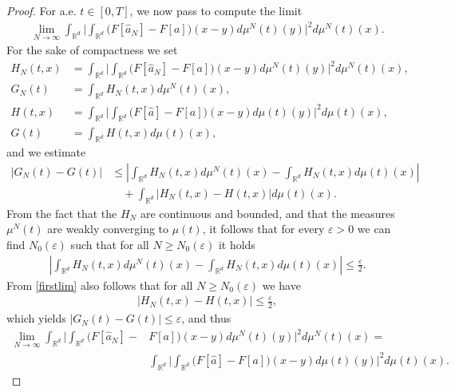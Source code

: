 \documentclass[A4paper,11pt]{article}
\theoremstyle{definition}
\newcommand{\R}{\mathbb{R}}
\begin{document}
\begin{proof}
	For a.e. $t \in [0,T]$, we now pass to compute the limit
	\begin{align*}
		\lim_{N\rightarrow\infty}
			\int_{\R^d}\Biggl|\int_{\R^d}\bigl(F[\widehat a_{N}]-F[a]\bigr)(x-y)d\mu^{N}(t)(y)\Biggr|^2d\mu^N(t)(x).
	\end{align*}
	For the sake of compactness we set
	\begin{align*}
		H_N(t,x)&=\int_{\R^d}\Biggl|\int_{\R^d}\bigl(F[\widehat a_{N}]-F[a]\bigr)(x-y)d\mu^{N}(t)(y)\Biggr|^2d\mu^N(t)(x),\\
		G_N(t)&= \int_{\R^d}H_N(t,x)d\mu^N(t)(x),\\
		H(t,x)&= \int_{\R^d}\Biggl|\int_{\R^d}\bigl(F[\widehat a]-F[a]\bigr)(x-y)d\mu(t)(y)\Biggr|^2d\mu(t)(x),\\
		G(t)&= \int_{\R^d}H(t,x)d\mu(t)(x),
	\end{align*}
	and we estimate
	\begin{align*}
		|G_N(t)-G(t)|&\leq \left|\int_{\R^d}H_N(t,x)d\mu^N(t)(x) - \int_{\R^d}H_N(t,x)d\mu(t)(x)\right|\\
		&\quad + \int_{\R^d}\left|H_N(t,x) - H(t,x)\right|d\mu(t)(x).
	\end{align*}
	From the fact that the $H_N$ are continuous and bounded, and that the measures $\mu^N(t)$ are weakly converging to $\mu(t)$, it follows that for every $\varepsilon > 0$ we can find $N_0(\varepsilon)$ such that for all $N \geq N_0(\varepsilon)$ it holds
	\begin{align*}
		\left|\int_{\R^d}H_N(t,x)d\mu^N(t)(x) - \int_{\R^d}H_N(t,x)d\mu(t)(x)\right|\leq \frac{\varepsilon}{2}.
	\end{align*}
	From \eqref{firstlim} also follows that for all $N \geq N_0(\varepsilon)$ we have
	\begin{align*}
	\left|H_N(t,x) - H(t,x)\right| \leq \frac{\varepsilon}{2},
	\end{align*}
	which yields $|G_N(t)-G(t)| \leq \varepsilon$, and thus
	\begin{align*}
		\lim_{N\rightarrow\infty}
			\int_{\R^d}\Biggl|\int_{\R^d}\bigl(F[\widehat a_{N}]-&F[a]\bigr)(x-y)d\mu^{N}(t)(y)\Biggr|^2d\mu^N(t)(x) = \\
			&\int_{\R^d}\Biggl|\int_{\R^d}\bigl(F[\widehat a]-F[a]\bigr)(x-y)d\mu(t)(y)\Biggr|^2d\mu(t)(x).
	\end{align*}
	

\end{proof}
\end{document}
